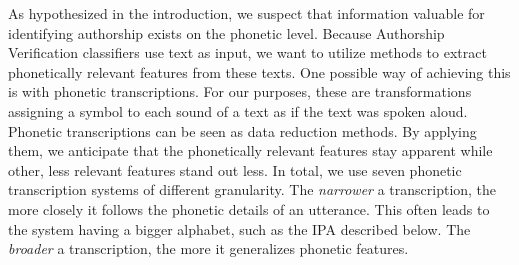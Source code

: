 As hypothesized in the introduction, we suspect that information valuable for identifying authorship exists on the phonetic level.
Because Authorship Verification classifiers use text as input, we want to utilize methods to extract phonetically relevant features from these texts.
One possible way of achieving this is with phonetic transcriptions.
For our purposes, these are transformations assigning a symbol to each sound of a text as if the text was spoken aloud.
Phonetic transcriptions can be seen as data reduction methods.
By applying them, we anticipate that the phonetically relevant features stay apparent while other, less relevant features stand out less.
In total, we use seven phonetic transcription systems of different granularity.
The \textit{narrower} a transcription, the more closely it follows the phonetic details of an utterance.
This often leads to the system having a bigger alphabet, such as the IPA described below.
The \textit{broader} a transcription, the more it generalizes phonetic features.\\

